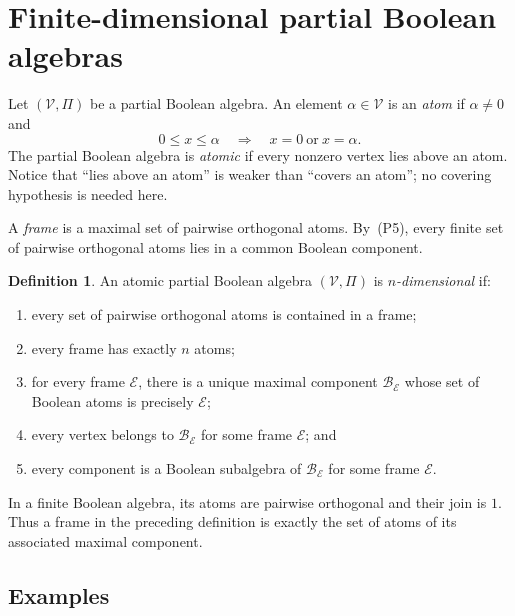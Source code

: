 \documentclass{article}   	%
\theoremstyle{plain}
\theoremstyle{definition}
\newtheorem{definition}[theorem]{Definition}
\theoremstyle{remark}
\begin{document}
\section{Finite-dimensional partial Boolean algebras}
\label{sec:finite-pba}

Let $(\mathcal V,\Pi)$ be a partial Boolean algebra.  An element
$\alpha\in\mathcal V$ is an \emph{atom} if $\alpha\ne0$ and
\[
0\le x\le\alpha
\quad\Longrightarrow\quad
x=0\ \text{or}\ x=\alpha.
\]
The partial Boolean algebra is \emph{atomic} if every nonzero vertex lies
above an atom.  Notice that ``lies above an atom'' is weaker than ``covers an
atom''; no covering hypothesis is needed here.

A \emph{frame} is a maximal set of pairwise orthogonal atoms.  By~\rm(P5),
every finite set of pairwise orthogonal atoms lies in a common Boolean
component.

\begin{definition}\label{def:finite-dimensional}
An atomic partial Boolean algebra $(\mathcal V,\Pi)$ is
\emph{$n$-dimensional} if:
\begin{enumerate}
\item every set of pairwise orthogonal atoms is contained in a frame;
\item every frame has exactly $n$ atoms;
\item for every frame $\mathcal E$, there is a unique maximal component
$\mathcal B_{\mathcal E}$ whose set of Boolean atoms is precisely
$\mathcal E$;
\item every vertex belongs to $\mathcal B_{\mathcal E}$ for some frame
$\mathcal E$; and
\item every component is a Boolean subalgebra of
$\mathcal B_{\mathcal E}$ for some frame $\mathcal E$.
\end{enumerate}
\end{definition}

In a finite Boolean algebra, its atoms are pairwise orthogonal and their join
is $1$.  Thus a frame in the preceding definition is exactly the set of atoms
of its associated maximal component.

\subsection{Examples}
\end{document}
